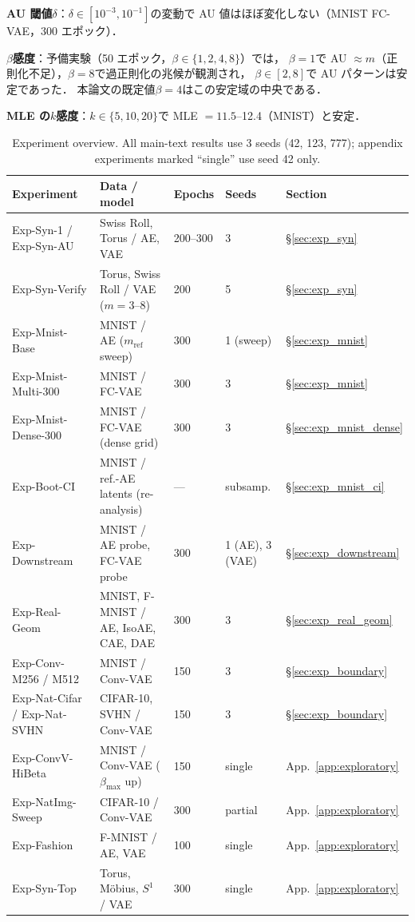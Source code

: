 \documentclass[11pt,a4paper]{jsarticle}
\begin{document}
\textbf{AU 閾値$\delta$}：$\delta \in [10^{-3}, 10^{-1}]$の変動で
AU 値はほぼ変化しない（MNIST FC-VAE，300 エポック）．

\textbf{$\beta$感度}：予備実験（50 エポック，$\beta \in \{1, 2, 4, 8\}$）では，
$\beta = 1$で AU $\approx m$（正則化不足），$\beta = 8$で過正則化の兆候が観測され，
$\beta \in [2, 8]$で AU パターンは安定であった．
本論文の既定値$\beta = 4$はこの安定域の中央である．

\textbf{MLE の$k$感度}：$k \in \{5, 10, 20\}$で MLE $= 11.5$--12.4（MNIST）と安定．

\begin{table}[H]
\centering
\caption{Experiment overview. All main-text results use 3 seeds
(42, 123, 777); appendix experiments marked ``single'' use seed 42 only.}
\label{tab:exp_list}
\small
\begin{tabular}{p{3.4cm}p{3.4cm}p{2.2cm}p{1.6cm}p{2.2cm}}
\toprule
Experiment & Data / model & Epochs & Seeds & Section \\
\midrule
Exp-Syn-1 / Exp-Syn-AU & Swiss Roll, Torus / AE, VAE & 200--300 & 3 & §\ref{sec:exp_syn} \\
Exp-Syn-Verify & Torus, Swiss Roll / VAE ($m = 3$--$8$) & 200 & 5 & §\ref{sec:exp_syn} \\
Exp-Mnist-Base & MNIST / AE ($m_{\mathrm{ref}}$ sweep) & 300 & 1 (sweep) & §\ref{sec:exp_mnist} \\
Exp-Mnist-Multi-300 & MNIST / FC-VAE & 300 & 3 & §\ref{sec:exp_mnist} \\
Exp-Mnist-Dense-300 & MNIST / FC-VAE (dense grid) & 300 & 3 & §\ref{sec:exp_mnist_dense} \\
Exp-Boot-CI & MNIST / ref.-AE latents (re-analysis) & --- & subsamp. & §\ref{sec:exp_mnist_ci} \\
Exp-Downstream & MNIST / AE probe, FC-VAE probe & 300 & 1 (AE), 3 (VAE) & §\ref{sec:exp_downstream} \\
Exp-Real-Geom & MNIST, F-MNIST / AE, IsoAE, CAE, DAE & 300 & 3 & §\ref{sec:exp_real_geom} \\
Exp-Conv-M256 / M512 & MNIST / Conv-VAE & 150 & 3 & §\ref{sec:exp_boundary} \\
Exp-Nat-Cifar / Exp-Nat-SVHN & CIFAR-10, SVHN / Conv-VAE & 150 & 3 & §\ref{sec:exp_boundary} \\
Exp-ConvV-HiBeta & MNIST / Conv-VAE ($\beta_{\max}$ up) & 150 & single & App.~\ref{app:exploratory} \\
Exp-NatImg-Sweep & CIFAR-10 / Conv-VAE & 300 & partial & App.~\ref{app:exploratory} \\
Exp-Fashion & F-MNIST / AE, VAE & 100 & single & App.~\ref{app:exploratory} \\
Exp-Syn-Top & Torus, M\"obius, $S^1$ / VAE & 300 & single & App.~\ref{app:exploratory} \\
\bottomrule
\end{tabular}
\end{table}
\end{document}
